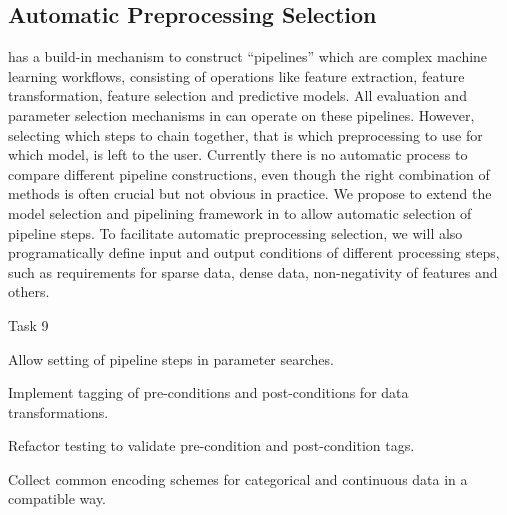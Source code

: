 \subsection{Automatic Preprocessing Selection}
\sklearn{} has a build-in mechanism to construct ``pipelines'' which are complex 
machine learning workflows, consisting of operations like feature extraction,
feature transformation, feature selection and predictive models.
All evaluation and parameter selection mechanisms in \sklearn{} can operate
on these pipelines.
However, selecting which steps to chain together, that is which preprocessing
to use for which model, is left to the user. Currently there is no
automatic process to compare different pipeline constructions, even though
the right combination of methods is often crucial but not obvious in practice.
We propose to extend the model selection and pipelining framework in \sklearn{}
to allow automatic selection of pipeline steps.
To facilitate automatic preprocessing selection, we will also programatically
define input and output conditions of different processing steps, such
as requirements for sparse data, dense data, non-negativity of features and others.
\begin{labeling}{Task 9}
    \item [Task 6] Allow setting of pipeline steps in \sklearn{} parameter searches.
    \item [Task 7] Implement tagging of pre-conditions and post-conditions for data transformations.
    \item [Task 8] Refactor \sklearn{} testing to validate pre-condition and post-condition tags.
    \item [Task 9] Collect common encoding schemes for categorical and
        continuous data in a \sklearn{} compatible way.
\end{labeling}


